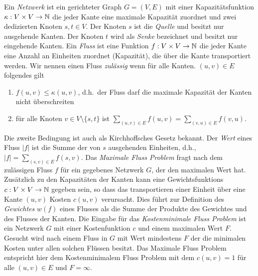 Ein \emph{Netzwerk} ist ein gerichteter Graph $G=(V,E)$ mit 
einer 
Kapazit\"atsfunktion $\kappa: V \times V \rightarrow \operatorname{\mathbb{N}}$ 
die jeder Kante 
eine maximale Kapazit\"at zuordnet und zwei dedizierten Knoten
$s,t \in V$. Der Knoten $s$ ist die \emph{Quelle} und 
besitzt nur ausgehende Kanten. Der Knoten $t$ wird als 
\emph{Senke} bezeichnet und besitzt nur eingehende Kanten. 
Ein \emph{Fluss} ist eine Funktion $f: V \times V \rightarrow \operatorname{\mathbb{N}}$ 
die jeder Kante 
eine Anzahl an Einheiten zuordnet (Kapazit\"at), die \"uber die Kante 
transportiert werden. Wir nennen einen Fluss \emph{zul\"assig}
wenn f\"ur alle Kanten. $(u,v) \in E$ folgendes gilt
\begin{enumerate}
 \item $f(u,v) \leq \kappa(u,v)$, d.h.~der Fluss darf die 
 maximale Kapazit\"at der Kanten nicht \"uberschreiten
 \item f\"ur alle Knoten $v \in V\setminus \{s,t\}$ ist
 $\sum_{(u,v)\in E}f(u,v) = \sum_{(v,u)\in E}f(v,u)$. 
\end{enumerate}
Die zweite Bedingung ist auch als Kirchhoffsches Gesetz bekannt. 
Der \emph{Wert} eines Fluss $|f|$ ist die Summe der 
von $s$ ausgehenden Einheiten, d.h., 
$|f| = \sum_{(s,v) \in E}f(s,v)$. 
Das \emph{Maximale Fluss Problem} fragt nach dem zul\"assigen
Fluss $f$ f\"ur ein gegebenes Netzwerk $G$, der den maximalen 
Wert hat. Zus\"atzlich zu den Kapazit\"aten der Kanten kann 
eine Gewichtsfunktions $c: V \times V \rightarrow \operatorname{\mathbb{N}}$ gegeben 
sein, so dass das transportieren einer Einheit \"uber eine Kante $(u,v)$
Kosten $c(u,v)$ verursacht. Dies f\"uhrt zur Definition des
\emph{Gewichtes} $w(f)$ eines Flusses als die Summe der 
Produkte des Gewichtes und des Flusses der Kanten. 
Die Eingabe f\"ur das \emph{Kostenminimale Fluss Problem} ist 
ein Netzwerk $G$ mit einer Kostenfunktion $c$ und einem maximalen 
Wert $F$. Gesucht wird nach einem Fluss in $G$ mit Wert mindestens
$F$ der die minimalen Kosten unter allen solchen Fl\"ussen besitzt.
Das Maximale Fluss Problem entspricht hier dem
Kostenminimalem Fluss Problem mit dem $c(u,v) = 1$ f\"ur alle 
$(u,v) \in E$ und $F = \infty$. \cite{schoening, kripfganz, algo}